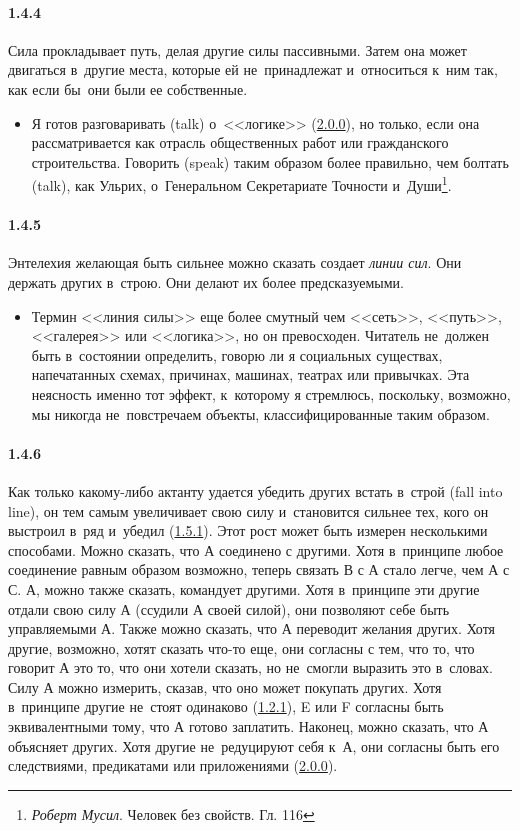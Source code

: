 \paragraph{1.4.4}\hypertarget{par:1.4.4}{} Сила прокладывает путь, делая другие силы пассивными. Затем она может двигаться в~другие места, которые ей не~принадлежат и~относиться к~ним так, как если бы~они были ее собственные.
	\begin{itemize}
	\item Я готов разговаривать (talk) о~<<логике>> (\hyperlink{par:2.0.0}{2.0.0}), но только, если она рассматривается как отрасль общественных работ или гражданского строительства. Говорить (speak) таким образом более правильно, чем болтать (talk), как Ульрих, о~Генеральном Секретариате Точности и~Души\footnote{{\itshape Роберт Мусил}. Человек без свойств. Гл. 116}.
	\end{itemize}

\paragraph{1.4.5}\hypertarget{par:1.4.5}{} Энтелехия желающая быть сильнее можно сказать создает {\itshape линии сил}. Они держать других в~строю. Они делают их более предсказуемыми. 
	\begin{itemize}
	\item Термин <<линия силы>> еще более смутный чем <<сеть>>, <<путь>>, <<галерея>> или <<логика>>, но он превосходен. Читатель не~должен быть в~состоянии определить, говорю ли я социальных существах, напечатанных схемах, причинах, машинах, театрах или привычках. Эта неясность именно тот эффект, к~которому я стремлюсь, поскольку, возможно, мы никогда не~повстречаем объекты, классифицированные таким образом.
	\end{itemize}

\paragraph{1.4.6}\hypertarget{par:1.4.6}{} Как только какому-либо актанту удается убедить других встать в~строй (fall into line), он тем самым увеличивает свою силу и~становится сильнее тех, кого он выстроил в~ряд и~убедил (\hyperlink{par:1.5.1}{1.5.1}). Этот рост может быть измерен несколькими способами. Можно сказать, что А соединено с другими. Хотя в~принципе любое соединение равным образом возможно, теперь связать В с А стало легче, чем А с С. А, можно также сказать, командует другими. Хотя в~принципе эти другие отдали свою силу А (ссудили А своей силой), они позволяют себе быть управляемыми А. Также можно сказать, что А переводит желания других. Хотя другие, возможно, хотят сказать что-то еще, они согласны с тем, что то, что говорит А это то, что они хотели сказать, но не~смогли выразить это в~словах. Силу А можно измерить, сказав, что оно может покупать других. Хотя в~принципе другие не~стоят одинаково (\hyperlink{par:1.2.1}{1.2.1}), E или F согласны быть эквивалентными тому, что А готово заплатить. Наконец, можно сказать, что А объясняет других. Хотя другие не~редуцируют себя к~А, они согласны быть его следствиями, предикатами или приложениями (\hyperlink{par:2.0.0}{2.0.0}).

